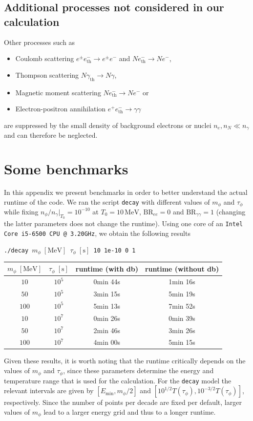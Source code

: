 \documentclass[11pt,a4paper]{article}
\newcommand{\eq}[1]{#1}
\begin{document}
\subsection*{Additional processes not considered in our calculation}
Other processes such as
\begin{itemize}
	\item Coulomb scattering $e^\pm e^-_\text{th} \rightarrow e^\pm e^-$ and $N e^-_\text{th} \rightarrow N e^-$,
	\item Thompson scattering $N \gamma_\text{th} \rightarrow N \gamma$,
	\item Magnetic moment scattering $N e^-_\text{th} \rightarrow N e^-$ or
	\item Electron-positron annihilation $e^+ e^-_\text{th} \rightarrow \gamma \gamma$
\end{itemize}
are suppressed by the small density of background electrons or nuclei  $\eq{n}_{e}, n_N \ll \eq{n}_{\gamma}$ and can therefore be neglected.


\section{Some benchmarks}
\label{sec:benchmarks_single}

In this appendix we present benchmarks in order to better understand the actual runtime of the code. We ran the script \texttt{decay} with different values of $m_\phi$ and $\tau_\phi$ while fixing $n_\phi/n_\gamma|_{T_0} = 10^{-10}$ at $T_0=10\,\mathrm{MeV}$, $\text{BR}_{ee} = 0$ and $\text{BR}_{\gamma\gamma}=1$ (changing the latter parameters does not change the runtime). Using one core of an \texttt{Intel Core i5-6500 CPU @ 3.20GHz}, we obtain the following results
\begin{center}
	\texttt{./decay $m_\phi\;\mathrm{[MeV]}$  $\tau_\phi\;\mathrm{[s]}$ 10 1e-10 0 1}
	\begin{tabular}{|c|c|c|c|}
		\hline
		$m_\phi\;\mathrm{[MeV]}$ & $\tau_\phi\;\mathrm{[s]}$ &  runtime (with db) & runtime (without db) \\
		\hline\hline
		$10$ & $10^5$ & 0min 44s & 1min 16s\\
		\hline
		$50$ & $10^5$ & 3min 15s & 5min 19s \\
		\hline
		$100$ & $10^5$ & 5min 13s & 7min 52s \\
		\hline\hline
		$10$ & $10^7$ & 0min 26s & 0min 39s\\
		\hline
		$50$ & $10^7$ & 2min 46s & 3min 26s\\
		\hline
		$100$ & $10^7$ & 4min 00s & 5min 15s\\
		\hline
	\end{tabular}
\end{center}
Given these results, it is worth noting that the runtime critically depends on the values of $m_\phi$ and $\tau_\phi$, since these parameters determine the energy and temperature range that is used for the calculation. For the \texttt{decay} model the relevant intervals are given by $[E_\text{min}, m_\phi/2]$ and $[10^{1/2}T(\tau_\phi), 10^{-3/2}T(\tau_\phi)]$, respectively. Since the number of points per decade are fixed per default, larger values of $m_\phi$ lead to a larger energy grid and thus to a longer runtime.
\end{document}
